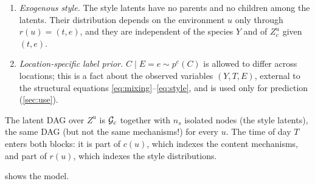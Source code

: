 \begin{definition}[Model M1]
\begin{enumerate}[label=(P\arabic*),leftmargin=2.4em]
      on the location: for environments $u=(y,t,e)$ and $u'=(y,t,e')$ with the same $(y,t)$, $Z_c^u$ and
      $Z_c^{u'}$ have the same law.
\item \label{item:P3} \emph{Exogenous style.} The style latents have no parents and no children among the latents.
      Their distribution depends on the environment $u$ only through $r(u)=(t,e)$, and they are
      independent of the species $Y$ and of $Z_c^u$ given $(t,e)$.
\item \label{item:P4} \emph{Location-specific label prior.} $C\mid E=e\sim p^{e}(C)$ is allowed to differ across
      locations; this is a fact about the observed variables $(Y,T,E)$, external to the structural
      equations \eqref{eq:mixing}--\eqref{eq:style}, and is used only for prediction
      (\cref{sec:use}).
\end{enumerate}
The latent DAG over $Z^u$ is $\mathcal{G}_c$ together with $n_s$ isolated nodes (the style latents), the same 
DAG (but not the same mechanisms!) for every $u$. The time of day $T$ enters both blocks: it is part 
of $c(u)$, which indexes the content mechanisms, and part of $r(u)$, which indexes the style 
distributions.
\end{definition}

 shows the model.

